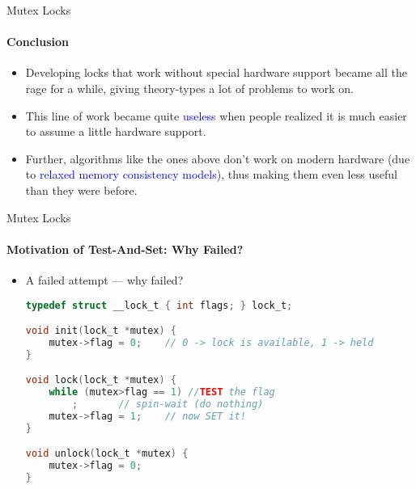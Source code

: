 \documentclass[10pt]{beamer}
\begin{document}
\begin{frame}{Mutex Locks}
\framesubtitle{Conclusion}
\begin{itemize}
 
\item Developing locks that work without special hardware support became all the rage for a while, giving theory-types a lot of problems to work on. 
\item This line of work became quite \textcolor{blue}{useless} when people realized it is much easier to assume a little hardware support.
\item Further, algorithms like the ones above don't work on modern hardware (due to \textcolor{blue}{relaxed memory consistency models}), thus making them even less useful than they were before.
\end{itemize}
\end{frame}

\begin{frame}[fragile]{Mutex Locks}
\framesubtitle{Motivation of Test-And-Set: Why Failed?}
\begin{itemize}
 
\item A failed attempt --- why failed?
\vspace{6pt}\\
\begin{lstlisting}[language=C]
typedef struct __lock_t { int flags; } lock_t;

void init(lock_t *mutex) {
	mutex->flag = 0;	// 0 -> lock is available, 1 -> held
}

void lock(lock_t *mutex) {
	while (mutex>flag == 1)	//TEST the flag
		;		// spin-wait (do nothing)
	mutex->flag = 1;	// now SET it!
}

void unlock(lock_t *mutex) {
	mutex->flag = 0;
}
\end{lstlisting}
\end{itemize}
\end{frame}
\end{document}
